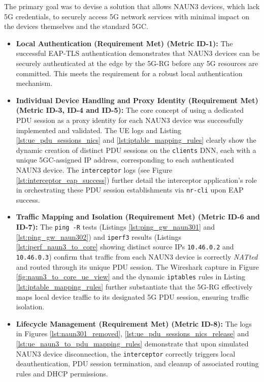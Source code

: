 The primary goal was to devise a solution that allows \ac{NAUN3} devices, which lack \ac{5G} credentials, to securely access \ac{5G} network services with minimal impact on the devices themselves and the standard \ac{5GC}.

\begin{itemize}
    \item \textbf{Local Authentication (Requirement Met) (Metric ID-1):} The successful \ac{EAP-TLS} authentication demonstrates that \ac{NAUN3} devices can be securely authenticated at the edge by the \ac{5G-RG} before any \ac{5G} resources are committed. This meets the requirement for a robust local authentication mechanism.

    \item \textbf{Individual Device Handling and Proxy Identity (Requirement Met) (Metric ID-3, ID-4 and ID-5):} The core concept of using a dedicated \ac{PDU} session as a proxy identity for each \ac{NAUN3} device was successfully implemented and validated. The \ac{UE} logs and Listing \ref{lst:ue_pdu_sessions_nics} and \ref{lst:iptable_mapping_rules} clearly show the dynamic creation of distinct \ac{PDU} sessions on the \texttt{clients} \ac{DNN}, each with a unique \ac{5GC}-assigned \ac{IP} address, corresponding to each authenticated \ac{NAUN3} device. The \texttt{interceptor} logs (see Figure \ref{lst:interceptor_eap_success}) further detail the interceptor application's role in orchestrating these \ac{PDU} session establishments via \texttt{nr-cli} upon \ac{EAP} success.

    \item \textbf{Traffic Mapping and Isolation (Requirement Met) (Metric ID-6 and ID-7):} The \texttt{ping -R} tests (Listings \ref{lst:ping_gw_naun301} and \ref{lst:ping_gw_naun302}) and \texttt{iperf3} results (Listings \ref{lst:iperf_naun3_to_core} showing distinct source \acp{IP} \texttt{10.46.0.2} and \texttt{10.46.0.3}) confirm that traffic from each \ac{NAUN3} device is correctly \textit{NATted} and routed through its unique \ac{PDU} session. The Wireshark capture in Figure \ref{fig:naun3_to_core_ue_view} and the dynamic \texttt{iptables} rules in Listing \ref{lst:iptable_mapping_rules} further substantiate that the \ac{5G-RG} effectively maps local device traffic to its designated \ac{5G} \ac{PDU} session, ensuring traffic isolation.

    \item \textbf{Lifecycle Management (Requirement Met) (Metric ID-8):} The logs in Figures \ref{lst:naun301_removed}, \ref{lst:ue_pdu_sessions_nics_release} and \ref{lst:ue_naun3_to_pdu_mapping_rules} demonstrate that upon simulated \ac{NAUN3} device disconnection, the \texttt{interceptor} correctly triggers local deauthentication, \ac{PDU} session termination, and cleanup of associated routing rules and \ac{DHCP} permissions.


\end{itemize}
